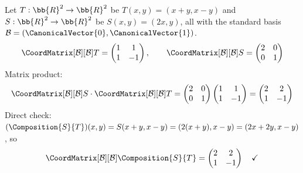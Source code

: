 \begin{example}[{$\CoordMatrix[\mathcal{B}_U][\mathcal{B}_W]{\Composition{S}{T}} = \CoordMatrix[\mathcal{B}_V][\mathcal{B}_W]{S} \cdot \CoordMatrix[\mathcal{B}_U][\mathcal{B}_V]{T}$} --- I]
    Let $T: \bb{R}^2 \to \bb{R}^2$ be $T(x,y) = (x + y, x - y)$ and
    $S: \bb{R}^2 \to \bb{R}^2$ be $S(x,y) = (2x, y)$, all with the standard basis
    $\mathcal{B} = (\CanonicalVector{0}, \CanonicalVector{1})$.
    \[
        \CoordMatrix[\mathcal{B}][\mathcal{B}]{T}
        = \begin{pmatrix} 1 & 1 \\ 1 & -1 \end{pmatrix}, \qquad
        \CoordMatrix[\mathcal{B}][\mathcal{B}]{S}
        = \begin{pmatrix} 2 & 0 \\ 0 & 1 \end{pmatrix}
    \]
    Matrix product:
    \[
        \CoordMatrix[\mathcal{B}][\mathcal{B}]{S}
        \cdot \CoordMatrix[\mathcal{B}][\mathcal{B}]{T}
        = \begin{pmatrix} 2 & 0 \\ 0 & 1 \end{pmatrix}
          \begin{pmatrix} 1 & 1 \\ 1 & -1 \end{pmatrix}
        = \begin{pmatrix} 2 & 2 \\ 1 & -1 \end{pmatrix}
    \]
    Direct check: $(\Composition{S}{T})(x,y) = S(x+y, x-y) = (2(x+y), x-y)
    = (2x + 2y, x - y)$, so
    \[
        \CoordMatrix[\mathcal{B}][\mathcal{B}]{\Composition{S}{T}}
        = \begin{pmatrix} 2 & 2 \\ 1 & -1 \end{pmatrix} \quad \checkmark
    \]
\end{example}


